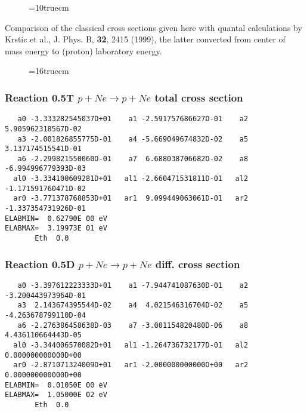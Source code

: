 \documentclass[12pt,dvipdfmx]{article}
\begin{document}
\begin{figure}[hb] \label{0.3a}
\epsfxsize=10truecm
\end{figure}
Comparison of the classical cross sections given here with quantal calculations
by Krstic et al., J. Phys. B, \textbf{32}, 2415 (1999), the latter converted from center of mass energy to (proton) laboratory energy.
\clearpage
\newpage

\begin{figure} \label{0.3}
\epsfxsize=16truecm
\end{figure}
\newpage



\subsubsection{
Reaction 0.5T   $ p + Ne \rightarrow p + Ne $ total cross
section }



\begin{small}\begin{verbatim}
   a0 -3.333282545037D+01    a1 -2.591757686627D-01    a2  5.905962318567D-02
   a3 -2.001826855775D-01    a4 -5.669049674832D-02    a5  3.137174515541D-01
   a6 -2.299821550060D-01    a7  6.688038706682D-02    a8 -6.994996779393D-03
  al0 -3.334100609281D+01   al1 -2.660471531811D-01   al2 -1.171591760471D-02
  ar0 -3.771378768853D+01   ar1  9.099449063061D-01   ar2 -1.337354731926D-01
ELABMIN=  0.62790E 00 eV
ELABMAX=  3.19973E 01 eV
       Eth  0.0
\end{verbatim}\end{small}

\subsubsection{
Reaction 0.5D    $p + Ne \rightarrow p + Ne  $ diff. cross
section }


\begin{small}\begin{verbatim}
   a0 -3.397612223333D+01    a1 -7.944741087630D-01    a2 -3.200443973964D-01
   a3  2.143674395544D-02    a4  4.021546316704D-02    a5 -4.263678799110D-04
   a6 -2.276386458638D-03    a7 -3.001154820480D-06    a8  4.436110664443D-05
  al0 -3.344006570082D+01   al1 -1.264736732177D-01   al2  0.000000000000D+00
  ar0 -2.871071324009D+01   ar1 -2.000000000000D+00   ar2  0.000000000000D+00
ELABMIN=  0.01050E 00 eV
ELABMAX=  1.05000E 02 eV
       Eth  0.0
\end{verbatim}\end{small}
\end{document}
